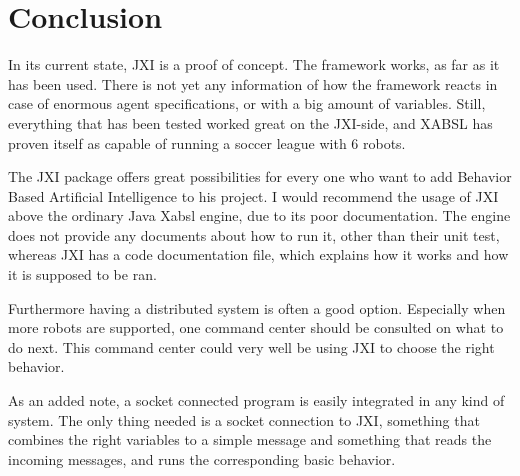 \documentclass[a4paper,10pt]{article}
\begin{document}
\section{Conclusion}
In its current state, JXI is a proof of concept. The framework works, as far as
it has been used. There is not yet any information of how the framework reacts
in case of enormous agent specifications, or with a big amount of variables.
Still, everything that has been tested worked great on the JXI-side, and XABSL
has proven itself as capable of running a soccer league with 6 robots. 

The JXI package offers great possibilities for every one who want to add
Behavior Based Artificial Intelligence to his project. I would recommend the
usage of JXI above the ordinary Java Xabsl engine, due to its poor
documentation. The engine does not provide any documents about how to run it,
other than their unit test, whereas JXI has a code documentation file, which
explains how it works and how it is supposed to be ran. 

Furthermore having a distributed system is often a good option. Especially when
more robots are supported, one command center should be consulted on what to do
next. This command center could very well be using JXI to choose the right
behavior.

As an added note, a socket connected program is easily integrated in any kind of
system. The only thing needed is a socket connection to JXI, something that
combines the right variables to a simple message and something that reads the
incoming messages, and runs the corresponding basic behavior. 
\end{document}
